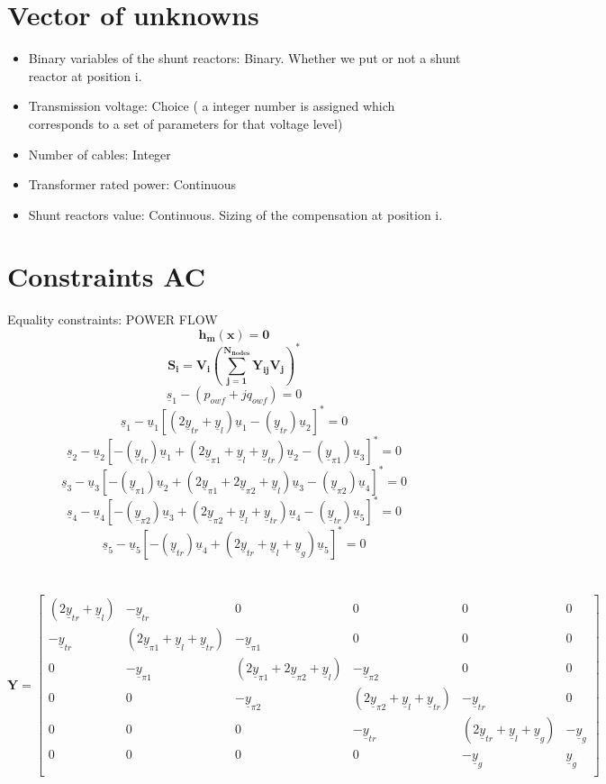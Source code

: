 \documentclass{article}
\begin{document}
\section{Vector of unknowns
}

\begin{itemize}
  \item Binary variables of the shunt reactors: Binary. Whether we put or not a shunt reactor at position i. 
  \item Transmission voltage: Choice ( a integer number is assigned which corresponds to a set of parameters for that voltage level)
  \item Number of cables: Integer
  \item Transformer rated power: Continuous
  \item Shunt reactors value: Continuous. Sizing of the compensation at position i.
\end{itemize}
\section{Constraints AC}
Equality constraints: POWER FLOW
\\
\[\mathbf{h_m(x)=0}\]
\[\mathbf{S_i=V_i(\sum_{j=1}^{N_{nodes}}Y_{ij}V_j)^*}\]
\[\underline{s}_1-(p_{owf}+jq_{owf})=0\]
\[\underline{s}_1-\underline{u}_1[(2\underline{y}_{tr}+\underline{y}_l)\underline{u}_1-(\underline{y}_{tr})\underline{u}_2]^*=0\]
\[\underline{s}_2-\underline{u}_2[-(\underline{y}_{tr})\underline{u}_1+(2\underline{y}_{\pi1}+\underline{y}_l+\underline{y}_{tr})\underline{u}_2-(\underline{y}_{\pi1})\underline{u}_3]^*=0\]
 \[\underline{s}_3-\underline{u}_3[-(\underline{y}_{\pi1})\underline{u}_2+(2\underline{y}_{\pi1}+2\underline{y}_{\pi2}+\underline{y}_{l})\underline{u}_3-(\underline{y}_{\pi2})\underline{u}_4]^*=0\]
 \[\underline{s}_4-\underline{u}_4[-(\underline{y}_{\pi2})\underline{u}_3+(2\underline{y}_{\pi2}+\underline{y}_l+\underline{y}_{tr})\underline{u}_4-(\underline{y}_{tr})\underline{u}_5]^*=0\]
 \[\underline{s}_5-\underline{u}_5[-(\underline{y}_{tr})\underline{u}_4+(2\underline{y}_{tr}+\underline{y}_l+\underline{y}_{g})\underline{u}_5]^*=0\]\\\\
 \[\mathbf{Y}=\begin{bmatrix}
 (2\underline{y}_{tr}+\underline{y}_l) & -\underline{y}_{tr} & 0 & 0 & 0 & 0\\
-\underline{y}_{tr} & (2\underline{y}_{\pi1}+\underline{y}_l+\underline{y}_{tr}) & -\underline{y}_{\pi1} & 0 & 0 & 0  \\
0 & -\underline{y}_{\pi1} & (2\underline{y}_{\pi1}+2\underline{y}_{\pi2}+\underline{y}_{l}) & -\underline{y}_{\pi2}   & 0 & 0 \\
0 & 0 & -\underline{y}_{\pi2} & (2\underline{y}_{\pi2}+\underline{y}_l+\underline{y}_{tr}) & -\underline{y}_{tr} & 0  \\
0 & 0 & 0 & -\underline{y}_{tr} & (2\underline{y}_{tr}+\underline{y}_l+\underline{y}_{g}) & -\underline{y}_{g}  \\
0 & 0 & 0 & 0 & -\underline{y}_{g} & \underline{y}_{g}\\
\end{bmatrix}\] \\
\end{document}
